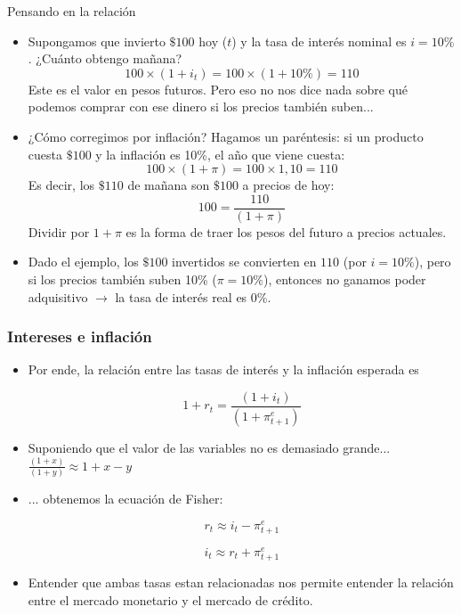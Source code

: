 \documentclass{beamer}
\begin{document}
\begin{frame}{Pensando en la relación}
\small
    \begin{itemize}
        \item Supongamos que invierto $\$100$ hoy ($t$) y la tasa de interés nominal  es $i=10\%$. ¿Cuánto obtengo mañana? 
        \[100 \times (1+i_t)= 100 \times (1+10\%)=110\]
        Este es el valor en pesos futuros. Pero eso no nos dice nada sobre qué podemos comprar con ese dinero si los precios también suben...
        \item ¿Cómo corregimos por inflación? Hagamos un paréntesis: si un producto cuesta $\$100$ y la inflación es 10\%, el año que viene cuesta:
        \[100 \times (1 + \pi) = 100 \times 1{,}10 = 110\]
        Es decir, los $\$110$ de mañana son $\$100$ a precios de hoy:
        \[100=\frac{110}{(1 + \pi)}\]
        Dividir por $1 + \pi$ es la forma de traer los pesos del futuro a precios actuales.
        \item Dado el ejemplo, los $\$100$ invertidos se convierten en $110$ (por $i=10\%$), pero si los precios también suben 10\% ($\pi=10\%$), entonces no ganamos poder adquisitivo $\rightarrow$ la tasa de interés real es 0\%. 
    \end{itemize}
\end{frame}


\begin{frame}
\frametitle{Intereses e inflación}
\begin{itemize}
    \item Por ende, la relación entre las tasas de interés y la inflación esperada es

        \[1+r_t=\frac{(1+i_t)}{(1+\pi_{t+1}^{e})}\]

    \item Suponiendo que el valor de las variables no es demasiado grande... $\frac{(1+x)}{(1+y)} \approx 1 + x - y $
    \item ... obtenemos la ecuación de Fisher: 

        \[r_t \approx i_t - \pi_{t+1}^{e}\]

        \[i_t \approx r_t + \pi_{t+1}^{e}\]

    \item Entender que ambas tasas estan relacionadas nos permite entender la relación entre el mercado monetario y el mercado de crédito.
    \end{itemize}
\end{frame}
\end{document}
